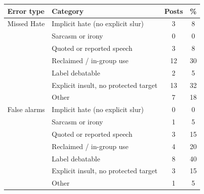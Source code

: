 \begin{tabular}{llcc}
\toprule
Error type & Category & Posts & \% \\
\midrule
Missed Hate & Implicit hate (no explicit slur) & 3 & 8 \\
 & Sarcasm or irony & 0 & 0 \\
 & Quoted or reported speech & 3 & 8 \\
 & Reclaimed / in-group use & 12 & 30 \\
 & Label debatable & 2 & 5 \\
 & Explicit insult, no protected target & 13 & 32 \\
 & Other & 7 & 18 \\
\midrule
False alarms & Implicit hate (no explicit slur) & 0 & 0 \\
 & Sarcasm or irony & 1 & 5 \\
 & Quoted or reported speech & 3 & 15 \\
 & Reclaimed / in-group use & 4 & 20 \\
 & Label debatable & 8 & 40 \\
 & Explicit insult, no protected target & 3 & 15 \\
 & Other & 1 & 5 \\
\bottomrule
\end{tabular}
